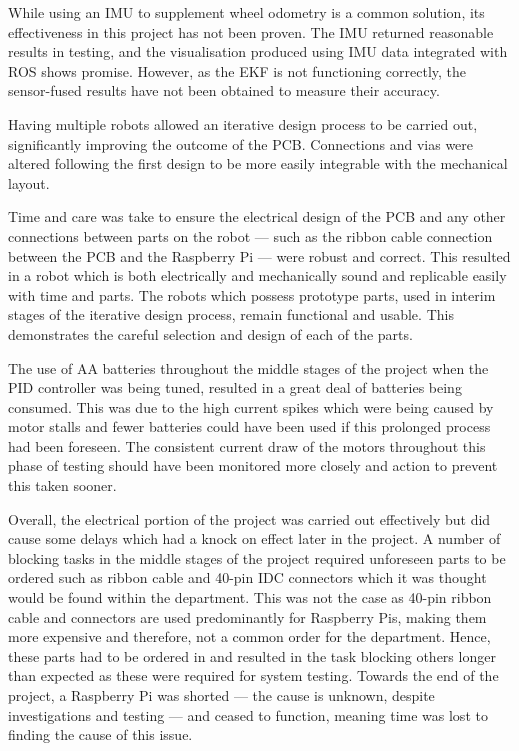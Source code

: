 While using an IMU to supplement wheel odometry is a common solution, its 
effectiveness in this project has not been proven. The IMU 
returned reasonable results in testing, and the visualisation produced using 
IMU data integrated with ROS shows promise. However, as the EKF is not 
functioning correctly, the sensor-fused results have not been obtained to 
measure their accuracy. 

Having multiple robots allowed an 
iterative design process to be carried out, significantly improving the outcome 
of the PCB. Connections and vias were altered following the first design to be 
more easily integrable with the mechanical layout.

Time and care was take to ensure the electrical design of the PCB and any other 
connections between parts on the robot --- such as the ribbon cable connection 
between the PCB and the Raspberry Pi --- were robust and correct. This resulted 
in a robot which is both electrically and mechanically sound and replicable 
easily with time and parts. The robots which possess prototype parts, used in 
interim stages of the iterative design process, remain functional and usable. 
This demonstrates the careful selection and design of each of the parts. 

The use of AA batteries throughout the middle stages of the project when the PID 
controller was being tuned, resulted in a great deal of batteries being consumed. 
This was due to the high current spikes which were being caused by motor stalls and 
fewer batteries could have been used if this prolonged process had been foreseen. The 
consistent current draw of the motors throughout this phase of testing should have 
been monitored more closely and action to prevent this taken sooner.   

Overall, the electrical portion of the project was carried out effectively but did 
cause some delays which had a knock on effect later in the project. A number of 
blocking tasks in the middle stages of the project required unforeseen parts to be 
ordered such as ribbon cable and 40-pin IDC connectors which it was thought would 
be found within the department. This was not the case as 40-pin ribbon cable and 
connectors are used predominantly for Raspberry Pis, making them more expensive 
and therefore, not a common order for the department. Hence, these parts had to be ordered in and resulted in the task blocking 
others longer than expected as these were required for system testing. Towards the end of the project, a Raspberry Pi was 
shorted --- the cause is unknown, despite investigations and testing --- and ceased to function, 
meaning time was lost to finding the cause of this issue.    
 

